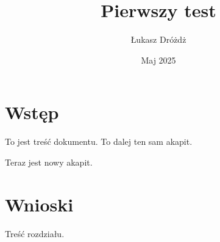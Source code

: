 \documentclass{article}  %
\title{Pierwszy test}    %
\author{Łukasz Dróżdż}   %
\date{Maj 2025}          %
\begin{document}

\maketitle               %

\section{Wstęp}          %

To jest treść dokumentu. %
To dalej ten sam akapit. %

Teraz jest nowy akapit.  %

\section{Wnioski}        %

Treść rozdziału.         %
\end{document}

